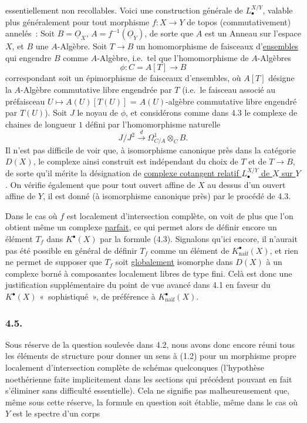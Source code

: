 essentiellement non recollables. Voici une construction g\'en\'erale de $L^{X/Y}_\bullet$, valable plus g\'en\'eralement pour tout morphisme $f:X\to Y$ de topos (commutativement) annel\'es~: Soit $B=\underline O_X$, $A=f^{-1}(\underline O_Y)$, de sorte que $A$ est un Anneau sur l'espace $X$, et $B$ une $A$-Alg\`ebre. Soit $T\to B$ un homomorphisme de faisceaux d'\underline{ensembles} qui engendre $B$ comme $A$-Alg\`ebre, i.e.\ tel que l'homomorphisme de $A$-Alg\`ebres
\[
\phi:C=A[T]\longrightarrow B
\]
correspondant soit un \'epimorphisme de faisceaux d'ensembles, o\`u $A[T]$ d\'esigne la $A$-Alg\`ebre commutative libre engendr\'ee par $T$ (i.e.\ le faisceau associ\'e au pr\'efaisceau $U\longmapsto A(U)[T(U)]$ = $A(U)$-alg\`ebre commutative libre engendr\'e par $T(U)$).
Soit $J$ le noyau de $\phi$, et consid\'erons comme dans 4.3 le complexe de chaines de longueur $1$ d\'efini par l'homomorphisme naturelle
\[
J/J^2\xrightarrow{d}\Omega^1_{C/A}\otimes_C B.
\]
Il n'est pas difficile de voir que, \`a isomorphisme canonique pr\`es dans la cat\'egorie $D(X)$, le complexe ainsi construit est ind\'ependant du choix de $T$ et de $T\to B$, de sorte qu'il m\'erite la d\'esignation de \uline{complexe cotangent relatif $L^{X/Y}_\bullet$ de $X$ sur $Y$}. On v\'erifie \'egalement que pour tout ouvert affine de $X$ au dessus d'un ouvert affine de $Y$, il est donn\'e (\`a isomorphisme canonique pr\`es) par le proc\'ed\'e de 4.3.

Dans le cas o\`u $f$ est localement d'intersection compl\`ete, on voit de plus que l'on obtient m\^eme un complexe \underline{parfait}, ce qui permet alors de d\'efinir encore un \'el\'ement $T_f$ dans $K^\bullet(X)$ par la formule (4.3). Signalons qu'ici encore, il n'aurait pas \'et\'e possible en g\'en\'eral de d\'efinir $T_f$ comme un \'el\'ement de $K^\bullet_{\mathrm{naif}}(X)$, et rien ne permet de supposer que $T_f$ soit \underline{globalement} isomorphe dans $D(X)$ \`a un complexe born\'e \`a composantes localement libres de type fini. Cel\`a est donc une justification suppl\'ementaire du point de vue avanc\'e dans 4.1 en faveur du $K^\bullet(X)$ «~sophistiqu\'e~», de pr\'ef\'erence \`a $K^\bullet_{\mathrm{naif}}(X)$.

\subsubsection*{4.5.}
Sous r\'eserve de la question soulev\'ee dans 4.2, nous avons donc encore r\'euni tous les \'el\'ements de structure pour donner un sens \`a (1.2) pour un morphisme propre localement d'intersection compl\`ete de sch\'emas quelconques (l'hypoth\`ese noeth\'erienne faite implicitement dans les sections qui pr\'ec\'edent pouvant en fait s'\'eliminer sans difficult\'e essentielle). Cela ne signifie pas malheureusement que, m\^eme sous cette r\'eserve, la formule en question soit \'etablie, m\^eme dans le cas o\`u $Y$ est le spectre d'un corps 
